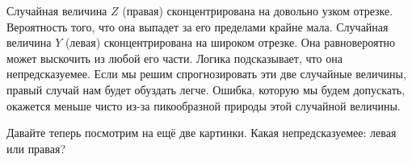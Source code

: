 \begin{figure}[H]
\begin{minipage}[H]{0.49\linewidth}
\end{minipage}
\hfill
\begin{minipage}[H]{0.49\linewidth}
\end{minipage}
\end{figure} 

Случайная величина $Z$ (правая) сконцентрирована на довольно узком отрезке. Вероятность того, что она выпадет за его пределами крайне мала. Случайная величина $Y$ (левая) сконцентрирована на широком отрезке. Она равновероятно может выскочить из любой его части. Логика подсказывает, что она непредсказуемее. Если мы решим спрогнозировать эти две случайные величины, правый случай нам будет обуздать легче. Ошибка, которую мы будем допускать, окажется меньше чисто из-за пикообразной природы этой случайной величины. 

Давайте теперь посмотрим на ещё две картинки. Какая непредсказуемее: левая или правая? 

